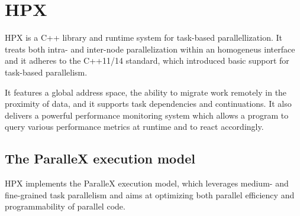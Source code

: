 
\section{HPX}
HPX is a C++ library and runtime system for task-based parallellization. It treats both intra- and inter-node parallelization within an homogeneus interface and it adheres to the C++11/14 standard, which introduced basic support for task-based parallelism.

It features a global address space, the ability to migrate work remotely in the proximity of data, and it supports task dependencies and continuations. It also delivers a powerful performance monitoring system which allows a program to query various performance metrics at runtime and to react accordingly.

\subsection{The ParalleX execution model}\label{subs:parallexModel}
HPX implements the ParalleX \cite{kaiser2009parallex} execution model, which leverages medium- and fine-grained task parallelism and aims at optimizing both parallel efficiency and programmability of parallel code.

